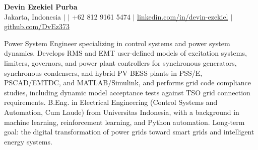 \begin{center}
    {\Large \textbf{Devin Ezekiel Purba}}\\
    
    {\small Jakarta, Indonesia $|$ \href{mailto:\cvemail}{\cvemail} $|$ +62 812 9161 5474 $|$ \href{https://www.linkedin.com/in/devin-ezekiel/}{linkedin.com/in/devin-ezekiel} $|$ \href{https://github.com/DvEz373}{github.com/DvEz373}}\\
\end{center}

\noindent
Power System Engineer specializing in control systems and power system dynamics. Develops RMS and EMT user-defined models of excitation systems, limiters, governors, and power plant controllers for synchronous generators, synchronous condensers, and hybrid PV-BESS plants in PSS/E, PSCAD/EMTDC, and MATLAB/Simulink, and performs grid code compliance studies, including dynamic model acceptance tests against TSO grid connection requirements. B.Eng. in Electrical Engineering (Control Systems and Automation, Cum Laude) from Universitas Indonesia, with a background in machine learning, reinforcement learning, and Python automation. Long-term goal: the digital transformation of power grids toward smart grids and intelligent energy systems.
